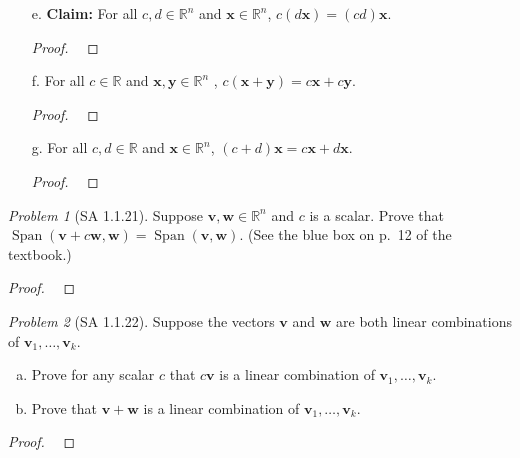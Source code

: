 \documentclass[fleqn,11pt]{paper}
\theoremstyle{remark}
\newtheorem{problem}{Problem}
\newcommand\R{\fld{R}}
\renewcommand{\vec}[1]{\mathbf{#1}}
\newcommand{\<}{\ensuremath{\langle}}
\renewcommand{\>}{\ensuremath{\rangle}}
\newcommand\fld[1]{\ensuremath{\mathbb{#1}}}
\newcommand\vv{\vec{v}}
\newcommand\vw{\vec{w}}
\newcommand\vx{\vec{x}}
\newcommand\vy{\vec{y}}
\newcommand\Span{\ensuremath{\operatorname{Span}}}
\begin{document}
\newpage

\begin{enumerate}
\item[e.] {\bf Claim:}
For all $c, d \in \R^n$ and $\vx \in \R^n$, $c(d\vx) = (cd)\vx$.
\begin{proof}
  ~
\vskip5cm
\end{proof}
\item[f.] 
For all $c \in \R$ and $\vx, \vy \in \R^n$ , $c(\vx + \vy) = c\vx + c\vy$.
\begin{proof}
  ~
\vskip5cm
\end{proof}
\item[g.] 
For all $c, d \in \R$ and $\vx \in \R^n$, $(c + d)\vx = c\vx + d\vx$.
\begin{proof}
  ~
\vskip5cm
\end{proof}

\end{enumerate}



\newpage

\begin{problem}[SA 1.1.21]
Suppose $\vv, \vw \in \R^n$ and $c$ is a scalar. Prove that 
$\Span (\vv + c\vw,\vw) = \Span (\vv,\vw)$. (See the blue box on p.~12 of the textbook.)
\end{problem}
\begin{proof}
~\vfill
\end{proof}

\newpage

\begin{problem}[SA 1.1.22]
Suppose the vectors $\vec{v}$ and $\vec{w}$ are both linear combinations of 
$\vec{v}_1, \dots, \vec{v}_k$.
\begin{enumerate}[a.]
\item 
Prove for any scalar $c$ that $c\vec{v}$ is a linear combination of 
$\vec{v}_1,\dots, \vec{v}_k$.
\item
Prove that $\vec{v} + \vec{w}$ is a linear combination of 
$\vec{v}_1,\dots,\vec{v}_k$.
\end{enumerate}
\end{problem}
\begin{proof}
~\vfill
\end{proof}
\end{document}
